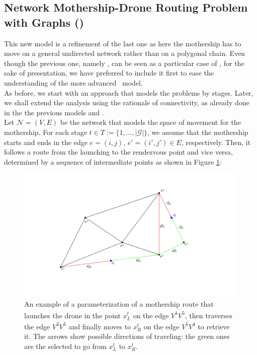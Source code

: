 \subsection{Network Mothership-Drone Routing Problem with Graphs (\NMD)}
\noindent
This new model is a refinement of the last one as here the mothership has to move on a general undirected network rather than on a polygonal chain.
Even though the previous one, namely \PMD, can be seen as a particular case of \NMD, for the sake of presentation, we have preferred to include it first to ease the understanding of the more advanced \NMD \ model.\\
\noindent
As before, we start with an approach that models the problems by stages. Later, we shall extend the analysis using the rationale of connectivity, as already done in the the previous models \AMD\xspace and \PMD.\\
\noindent
Let $\mathcal N=(V, E)$ be the network that models the space of movement for the mothership. For each stage $t\in T:= \{1,\ldots,|\mathcal G|\}$, we assume that the mothership starts and ends in the edge $e=(i,j), \, e'=(i',j')\in E$, respectively. Then, it follows a route from the launching to the rendezvous point and vice versa, determined by a sequence of intermediate points as shown in Figure \ref{fig:NMDRPG}:

\begin{figure}[h!]
\begin{center}
 \includegraphics[width=1\linewidth]{NMDRPG.png}
\end{center}
\caption{An example of a parameterization of a mothership route that launches the drone in the point $x_L^t$ on the edge $\overline{V^1V^5}$, then traverses the edge $\overline{V^2V^5}$ and finally moves to $x_R^t$ on the edge $\overline{V^5V^4}$ to retrieve it. The arrows show possible directions of traveling: the green ones are the selected to go from $x_L^t$ to $x_R^t$.}
\label{fig:NMDRPG}
\end{figure}

